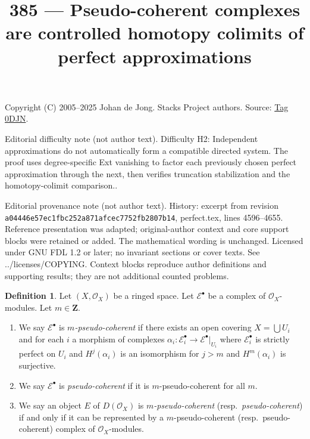 \documentclass{amsart}
\theoremstyle{plain}
\theoremstyle{definition}
\newtheorem{definition}[subsection]{Definition}
\theoremstyle{remark}
\numberwithin{equation}{subsection}
\begin{document}
\title[Stacks Project, Tag 0DJN]{385 --- Pseudo-coherent complexes are controlled homotopy colimits of perfect approximations}
\maketitle
\noindent Copyright (C) 2005--2025 Johan de Jong. Stacks Project authors. Source: \href{https://stacks.math.columbia.edu/tag/0DJN}{Tag 0DJN}.

\noindent Editorial difficulty note (not author text). Difficulty H2: Independent approximations do not automatically form a compatible directed system. The proof uses degree-specific Ext vanishing to factor each previously chosen perfect approximation through the next, then verifies truncation stabilization and the homotopy-colimit comparison..

\noindent Editorial provenance note (not author text). History: excerpt from revision \texttt{a0444\allowbreak 6e57e\allowbreak c1fbc\allowbreak 252a8\allowbreak 71afc\allowbreak ec775\allowbreak 2fb28\allowbreak 07b14}, perfect.tex, lines 4596--4655. Reference presentation was adapted; original-author context and core support blocks were retained or added. The mathematical wording is unchanged. Licensed under GNU FDL 1.2 or later; no invariant sections or cover texts. See ../licenses/COPYING. Context blocks reproduce author definitions and supporting results; they are not additional counted problems.

\begin{definition}
\label{cohomology-definition-pseudo-coherent}
Let $(X, \mathcal{O}_X)$ be a ringed space. Let $\mathcal{E}^\bullet$
be a complex of $\mathcal{O}_X$-modules. Let $m \in \mathbf{Z}$.
\begin{enumerate}
\item We say $\mathcal{E}^\bullet$ is {\it $m$-pseudo-coherent}
if there exists an open covering $X = \bigcup U_i$ and for each $i$
a morphism of complexes
$\alpha_i : \mathcal{E}_i^\bullet \to \mathcal{E}^\bullet|_{U_i}$
where $\mathcal{E}_i^\bullet$ is strictly perfect on $U_i$ and
$H^j(\alpha_i)$ is an isomorphism for $j > m$ and $H^m(\alpha_i)$
is surjective.
\item We say $\mathcal{E}^\bullet$ is {\it pseudo-coherent}
if it is $m$-pseudo-coherent for all $m$.
\item We say an object $E$ of $D(\mathcal{O}_X)$ is
{\it $m$-pseudo-coherent} (resp.\ {\it pseudo-coherent})
if and only if it can be represented by a $m$-pseudo-coherent
(resp.\ pseudo-coherent) complex of $\mathcal{O}_X$-modules.
\end{enumerate}
\end{definition}
\end{document}
